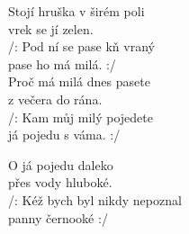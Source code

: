 
\ve{}
Stojí hruška v širém poli\\
vrek se jí zelen.\\
/: Pod ní se pase kň vraný\\
pase ho má milá. :/ \\


\ve{}
Proč má milá dnes pasete\\
z večera do rána.\\
/: Kam můj milý pojedete\\
já pojedu s váma. :/

\ve{}
O já pojedu daleko\\
přes vody hluboké.\\
/: Kéž bych byl nikdy nepoznal\\
panny černooké :/


\esong{}